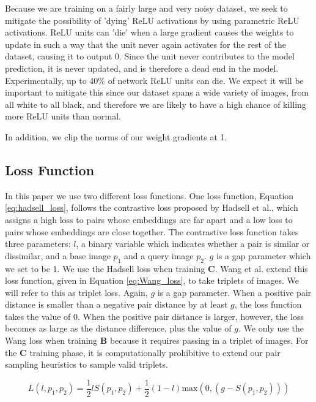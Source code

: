 Because we are training on a fairly large and very noisy dataset, we seek to mitigate the possibility of 'dying' ReLU activations by using parametric ReLU activations. ReLU units can 'die' when a large gradient causes the weights to update in such a way that the unit never again activates for the rest of the dataset, causing it to output 0. Since the unit never contributes to the model prediction, it is never updated, and is therefore a dead end in the model. Experimentally, up to 40\% of network ReLU units can die. We expect it will be important to mitigate this since our dataset spans a wide variety of images, from all white to all black, and therefore we are likely to have a high chance of killing more ReLU units than normal.

In addition, we clip the norms of our weight gradients at 1.

\subsection{Loss Function}
In this paper we use two different loss functions. One loss function, Equation \ref{eq:hadsell_loss}, follows the contrastive loss proposed by Hadsell et al.\cite{hadsell2006dimensionality}, which assigns a high loss to pairs whose embeddings are far apart and a low loss to pairs whose embeddings are close together. The contrastive loss function takes three parameters: $l$, a binary variable which indicates whether a pair is similar or dissimilar, and a base image $p_1$ and a query image $p_2$. $g$ is a gap parameter which we set to be 1. We use the Hadsell loss when training $\mathbf{C}$. Wang et al.\cite{wang2014learning} extend this loss function, given in Equation \ref{eq:Wang_loss}, to take triplets of images. We will refer to this as triplet loss. Again, $g$ is a gap parameter. When a positive pair distance is smaller than a negative pair distance by at least $g$, the loss function takes the value of 0. When the positive pair distance is larger, however, the loss becomes as large as the distance difference, plus the value of $g$. We only use the Wang loss when training $\mathbf{B}$ because it requires passing in a triplet of images. For the $\mathbf{C}$ training phase, it is computationally prohibitive to extend our pair sampling heuristics to sample valid triplets.

\begin{equation} \label{eq:hadsell_loss}
L(l, p_1, p_2) = \dfrac{1}{2}lS(p_1, p_2) + \dfrac{1}{2}(1-l)\text{max}(0, (g-S(p_1,p_2)))
\end{equation}

